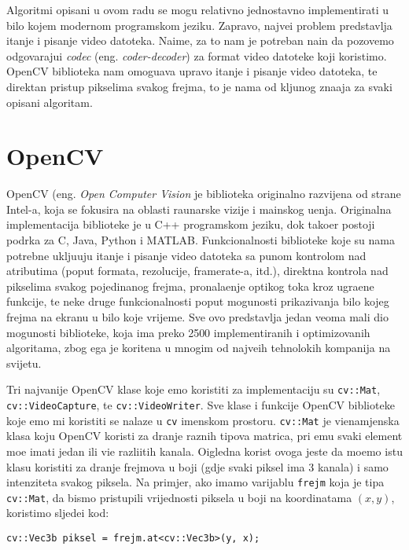 Algoritmi opisani u ovom radu se mogu relativno jednostavno implementirati u bilo kojem modernom programskom jeziku. Zapravo, najve\cj i problem predstavlja \ch itanje i pisanje video datoteka. Naime,
za to nam je potreban na\ch in da pozovemo odgovaraju\cj i \textit{codec} (eng. \textit{coder-decoder}) za format video datoteke koji koristimo. OpenCV biblioteka nam omogu\cj ava upravo \ch itanje
i pisanje video datoteka, te direktan pristup pikselima svakog frejma, \sh to je nama od klju\ch nog zna\ch aja za svaki opisani algoritam.

\section{OpenCV} %
OpenCV (eng. \textit{Open Computer Vision} je biblioteka originalno razvijena od strane Intel-a, koja se fokusira na oblasti ra\ch unarske vizije i ma\sh inskog u\ch enja. Originalna implementacija biblioteke
je u C++ programskom jeziku, dok tako\dj er postoji podr\sh ka za C, Java, Python i MATLAB. Funkcionalnosti biblioteke koje su nama potrebne uklju\ch uju \ch itanje i pisanje video datoteka sa punom
kontrolom nad atributima (poput formata, rezolucije, framerate-a, itd.), direktna kontrola nad pikselima svakog pojedina\ch nog frejma, pronala\zh enje opti\ch kog toka kroz ugra\dj ene funkcije, te neke
druge funkcionalnosti poput mogu\cj nosti prikazivanja bilo kojeg frejma na ekranu u bilo koje vrijeme. Sve ovo predstavlja jedan veoma mali dio mogu\cj nosti biblioteke, koja ima preko 2500 implementiranih
i optimizovanih algoritama, zbog \ch ega je kori\sh tena u mnogim od najve\cj ih tehnolo\sh kih kompanija na svijetu\cite{opencvabout}.

Tri najva\zh nije OpenCV klase koje \cj emo koristiti za implementaciju su \lstinline{cv::Mat}, \lstinline{cv::VideoCapture}, te \lstinline{cv::VideoWriter}. Sve klase i funkcije OpenCV biblioteke koje \cj emo mi koristiti
 se nalaze u \lstinline{cv}
imenskom prostoru\cite{cvdocs}. \lstinline{cv::Mat} je vi\sh enamjenska klasa koju OpenCV koristi za dr\zh anje raznih tipova matrica, pri \ch emu svaki element mo\zh e imati jedan ili vi\sh e razli\ch itih kanala. O\ch igledna
korist ovoga jeste da mo\zh emo istu klasu koristiti za dr\zh anje frejmova u boji (gdje svaki piksel ima 3 kanala) i samo intenziteta svakog piksela. Na primjer, ako imamo varijablu \lstinline{frejm} koja je tipa
\lstinline{cv::Mat}, da bismo pristupili vrijednosti piksela u boji na koordinatama $(x,y)$, koristimo sljede\cj i kod:
\begin{lstlisting}
cv::Vec3b piksel = frejm.at<cv::Vec3b>(y, x);
\end{lstlisting}

